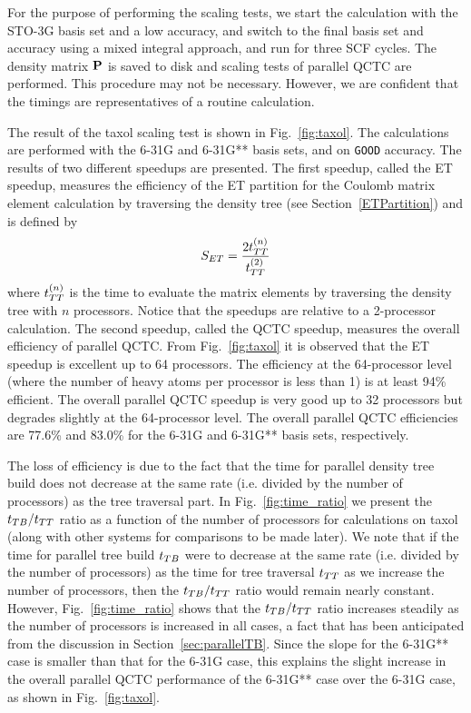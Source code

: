 \commentoutA{\documentclass[prl,aps,twocolumn,twocolumngrid,superbib]{revtex4}}
\begin{document}
For the purpose of performing the scaling tests, we start the
calculation with the STO-3G basis set and a low accuracy, and switch
to the final basis set and accuracy using a mixed integral approach,
and run for three SCF cycles. The density matrix ${\bf P}$ is saved to
disk and scaling tests of parallel QCTC are performed. This procedure
may not be necessary. However, we are confident that the timings are
representatives of a routine calculation.

The result of the taxol scaling test is shown in Fig.~\ref{fig:taxol}.
The calculations are performed with the 6-31G and 6-31G** basis sets,
and on {\tt GOOD} accuracy.  The results of two different speedups are
presented.  The first speedup, called the ET speedup, measures the
efficiency of the ET partition for the Coulomb matrix element
calculation by traversing the density tree (see
Section~\ref{ETPartition}) and is defined by
\begin{equation}
S_{ET} = \frac{2t_{TT}^{(n)}}{t_{TT}^{(2)}}
\end{equation}
where $t_{TT}^{(n)}$ is the time to evaluate the matrix elements by
traversing the density tree with $n$ processors. Notice that the
speedups are relative to a 2-processor calculation.  The second
speedup, called the QCTC speedup, measures the overall efficiency of
parallel QCTC.  From Fig.~\ref{fig:taxol} it is observed that the ET
speedup is excellent up to 64 processors. The efficiency at the
64-processor level (where the number of heavy atoms per processor is
less than 1) is at least 94\% efficient.
The overall parallel QCTC speedup is very good up to 32 processors but
degrades slightly at the 64-processor level.  The overall parallel
QCTC efficiencies are
77.6\% and 83.0\% for the 6-31G and 6-31G** basis sets, respectively.

The loss of efficiency is due to the fact that the time for parallel
density tree build does not decrease at the same rate (i.e.  divided
by the number of processors) as the tree traversal part.  In
Fig.~\ref{fig:time_ratio} we present the $t_{TB}/t_{TT}$ ratio as a
function of the number of processors for calculations on taxol (along
with other systems for comparisons to be made later).  We note that if
the time for parallel tree build $t_{TB}$ were to decrease at the same
rate (i.e. divided by the number of processors) as the time for tree
traversal $t_{TT}$ as we increase the number of processors, then the
$t_{TB}/t_{TT}$ ratio would remain nearly constant.  However,
Fig.~\ref{fig:time_ratio} shows that the $t_{TB}/t_{TT}$ ratio increases
steadily as the number of processors is increased in all cases, a fact
that has been anticipated from the discussion in
Section~\ref{sec:parallelTB}.  Since the slope for the 6-31G** case is
smaller than that for the 6-31G case, this explains the slight
increase in the overall parallel QCTC performance of the 6-31G** case
over the 6-31G case, as shown in Fig.~\ref{fig:taxol}.
\end{document}
